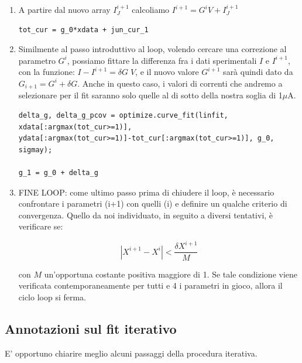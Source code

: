 \documentclass[10pt,letterpaper]{article}
\begin{document}
\begin{enumerate}
\item A partire dal nuovo array $I_{J}^{i+1}$ calcoliamo $I^{i+1} = G^i V + I_{J}^{i+1}$

\begin{lstlisting}
tot_cur = g_0*xdata + jun_cur_1
\end{lstlisting}

\item Similmente al passo introduttivo al loop, volendo cercare una correzione al parametro $G^i$, possiamo fittare la differenza fra i dati sperimentali $I$ e $I^{i+1}$, con la funzione: $I - I^{i+1} = \delta G \; V$, e il nuovo valore $G^{i+1}$ sarà quindi dato da $G_{i+1} = G^i +\delta G$. Anche in questo caso, i valori di correnti che andremo a selezionare per il fit saranno solo quelle al di sotto della nostra soglia di 1$\mu$A.

\begin{lstlisting}
delta_g, delta_g_pcov = optimize.curve_fit(linfit, xdata[:argmax(tot_cur>=1)],
ydata[:argmax(tot_cur>=1)]-tot_cur[:argmax(tot_cur>=1)], g_0, sigmay);

g_1 = g_0 + delta_g
\end{lstlisting} 

\item FINE LOOP: come ultimo passo prima di chiudere il loop, è necessario confrontare i parametri (i+1) con quelli (i) e definire un qualche criterio di convergenza. Quello da noi individuato, in seguito a diversi tentativi, è verificare se:

\begin{equation}
\left| X^{i+1} - X^{i}  \right| < \frac{\delta X^{i+1}}{M}
\end{equation}

con $M$ un'opportuna costante positiva maggiore di 1. Se tale condizione viene verificata contemporaneamente per tutti e 4 i parametri in gioco, allora il ciclo loop si ferma.

\end{enumerate}

\subsection{Annotazioni sul fit iterativo}
E' opportuno chiarire meglio alcuni passaggi della procedura iterativa.\\
\end{document}
